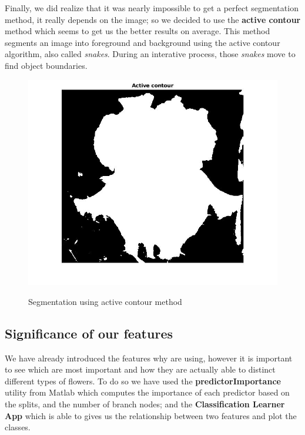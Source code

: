 \documentclass[11]{article}
\begin{document}
Finally, we did realize that it was nearly impossible to get a perfect segmentation method, it really depends on the image; so we decided to use the \textbf{active contour} method which seems to get us the better results on average. This method segments an image into foreground and background using the active contour algorithm, also called \textit{snakes}. During an interative process, those \textit{snakes} move to find object boundaries.

\begin{figure}[H]
    \centering
  \includegraphics[scale=0.30]{images/segmentation4.jpg}
    \label{segmentation4}
    \caption{Segmentation using active contour method}
\end{figure}

\subsection{Significance of our features}
We have already introduced the features why are using, however it is important to see which are most important and how they are actually able to distinct different types of flowers. To do so we have used the \textbf{predictorImportance} utility from Matlab which computes the importance of each predictor based on the splits, and the number of branch nodes; and the \textbf{Classification Learner App} which is able to gives us the relationship between two features and plot the classes.
\end{document}
